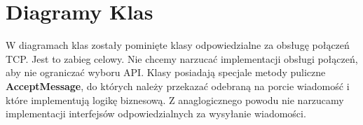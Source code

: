 \documentclass[../Dokumentacja.tex]{subfiles}
\begin{document}
\section{Diagramy Klas}
W diagramach klas zostały pominięte klasy odpowiedzialne za obsługę połączeń TCP.
Jest to zabieg celowy. Nie chcemy narzucać implementacji obsługi połączeń, aby
nie ograniczać wyboru API. Klasy posiadają specjale metody puliczne \textbf{AcceptMessage},
do których należy przekazać odebraną na porcie wiadomość i które implementują
logikę biznesową. Z anaglogicznego powodu nie narzucamy implementacji interfejsów
odpowiedzialnych za wysyłanie wiadomości.



\end{document}
